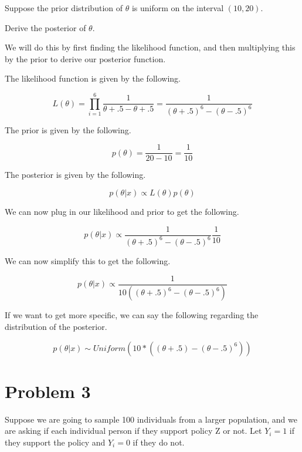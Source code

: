 \documentclass[12pt, letterpaper]{article}
\begin{document}
Suppose the prior distribution of $\theta$ is uniform on the interval $(10, 20)$.

Derive the posterior of $\theta$. 

We will do this by first finding the likelihood function, and then multiplying this by the prior to derive our posterior function. 

The likelihood function is given by the following. 

\begin{equation}
L(\theta) = \prod_{i=1}^{6} \frac{1}{\theta + .5 - \theta + .5} = \frac{1}{(\theta + .5)^6 - (\theta - .5)^6} 
\end{equation} 

The prior is given by the following. 

\begin{equation} 
p(\theta) = \frac{1}{20 - 10} = \frac{1}{10} 
\end{equation} 

The posterior is given by the following. 

\begin{equation} 
p(\theta | x) \propto L(\theta) p(\theta) 
\end{equation} 

We can now plug in our likelihood and prior to get the following. 

\begin{equation}
p(\theta | x) \propto \frac{1}{(\theta + .5)^6 - (\theta - .5)^6} \frac{1}{10} 
\end{equation} 

We can now simplify this to get the following. 

\begin{equation} 
p(\theta | x) \propto \frac{1}{10((\theta + .5)^6 - (\theta - .5)^6)} 
\end{equation} 

If we want to get more specific, we can say the following regarding the distribution of the posterior. 

\begin{equation} 
p(\theta | x) \sim Uniform(10 * ((\theta + .5) - (\theta - .5)^6))
\end{equation} 

\section{Problem 3}

Suppose we are going to sample 100 individuals from a larger population, and we are asking if each individual person if they support policy Z or not. Let $Y_i = 1$ if they support the policy and $Y_i = 0$ if they do not. 
\end{document}
